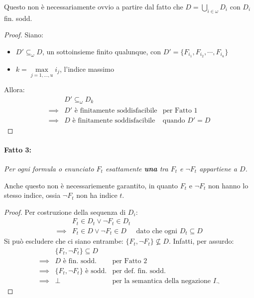 Questo non è necessariamente ovvio a partire dal fatto 
che $D = \bigcup\limits_{i \in \omega} D_i$ con $D_i$ fin. sodd.\\
\begin{proof}
Siano:
\begin{itemize}
  \item $D' \subseteq_{\omega} D$, un sottoinsieme finito qualunque, con $D' = \{F_{i_1}, F_{i_2},\cdots,F_{i_u}\}$
  \item $k = \max\limits_{j=1,...,u} i_j$, l'indice massimo
\end{itemize}
Allora:
\begin{align*}
  & D' \subseteq_{\omega} D_k\\
  \implies & D' \text{ è finitamente soddisfacibile} & \text{per Fatto 1} \\
  \implies & D \text{ è finitamente soddisfacibile} & \text{quando } D' = D
\end{align*}
\end{proof}

\paragraph{Fatto 3:}
\textit{Per ogni formula o enunciato $F_t$ esattamente \textbf{una} tra $F_t$ e $\neg F_t$ appartiene a $D$.}

Anche questo non è necessariemente garantito, in quanto $F_t$ e $\neg F_t$ non hanno lo stesso indice, ossia $\neg F_t$ non ha indice $t$.\\
\begin{proof}
Per costruzione della sequenza di $D_i$:
\begin{align*}
  & F_t \in D_t \vee \neg F_t \in D_t\\
  \implies & F_t \in D \vee \neg F_t \in D & \text{dato che ogni } D_t \subseteq D
\end{align*}
Si può escludere che ci siano entrambe: $\{F_t, \neg F_t\} \nsubseteq D$. Infatti, per assurdo:
\begin{align*}
  & \{F_t, \neg F_t\} \subseteq D\\
  \implies & D \text{ è fin. sodd.} & \text{per Fatto 2}\\
  \implies & \{F_t, \neg F_t\} \text{ è sodd.} & \text{per def. fin. sodd.} \\
  \implies & \bot & \text{per la semantica della negazione } I_\neg
\end{align*}
\end{proof}

